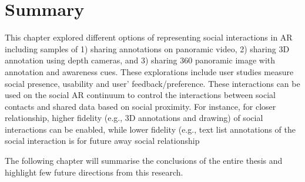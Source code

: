 \section{Summary}

This chapter explored different options of representing social interactions in AR including samples of 1) sharing annotations on panoramic video, 2) sharing 3D annotation using depth cameras, and 3) sharing 360 panoramic image with annotation and awareness cues. These explorations include user studies measure social presence, usability and user' feedback/preference. These interactions can be used on the social AR continuum to control the interactions between social contacts and shared data based on social proximity. For instance, for closer relationship, higher fidelity (e.g., 3D annotations and drawing) of social interactions can be enabled, while lower fidelity (e.g., text list annotations  of the social interaction is for future away social relationship

The following chapter will summarise the conclusions of the entire thesis and highlight few future directions from this research.
